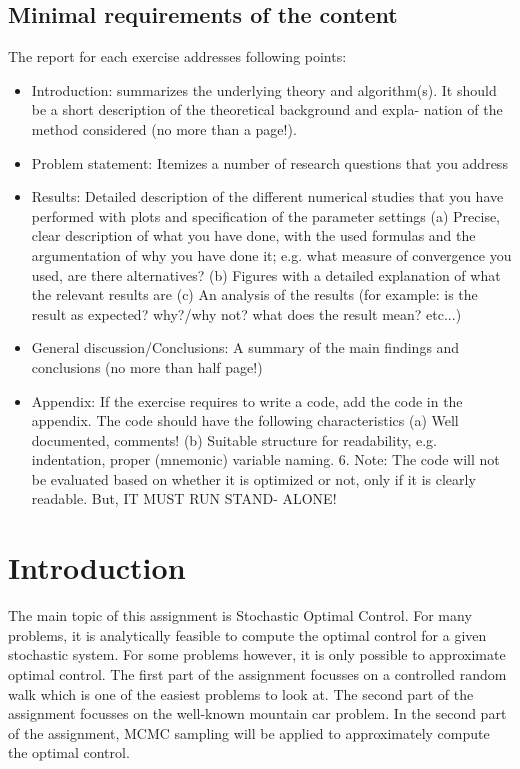 \documentclass[10pt,a4paper]{article}
\begin{document}
\subsection{Minimal requirements of the content}
The report for each exercise addresses following points:
\begin{itemize}
\item Introduction: summarizes the underlying theory and algorithm(s). It should be a short description of the theoretical background and expla- nation of the method considered (no more than a page!).
\item Problem statement: Itemizes a number of research questions that you address
\item Results: Detailed description of the different numerical studies that you have performed with plots and specification of the parameter settings (a) Precise, clear description of what you have done, with the used formulas and the argumentation of why you have done it; e.g. what measure of convergence you used, are there alternatives? (b) Figures with a detailed explanation of what the relevant results are (c) An analysis of the results (for example: is the result as expected? why?/why not? what does the result mean? etc...)
\item General discussion/Conclusions: A summary of the main findings and conclusions (no more than half page!)
\item Appendix: If the exercise requires to write a code, add the code in the appendix. The code should have the following characteristics (a) Well documented, comments! (b) Suitable structure for readability, e.g. indentation, proper (mnemonic) variable naming. 6. Note: The code will not be evaluated based on whether it is optimized or not, only if it is clearly readable. But, IT MUST RUN STAND- ALONE!
\end{itemize}

\color{black}
\fi

\newpage
\section{Introduction}
The main topic of this assignment is Stochastic Optimal Control. For many problems, it is analytically feasible to compute the optimal control for a given stochastic system. For some problems however, it is only possible to approximate optimal control. The first part of the assignment focusses on a controlled random walk which is one of the easiest problems to look at. The second part of the assignment focusses on the well-known mountain car problem. In the second part of the assignment, MCMC sampling will be applied to approximately compute the optimal control.
\end{document}
